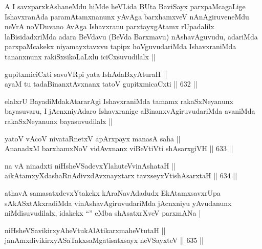 \begin{artha}
A I savxparxkAshaneMdu hiMde heVLida BUta BaviSayx parxpaMcagaLige
IshavxranAda paramAtamxnanunx yAvAga barxhamxveV nAnAgiruveneMdu neVrA
noVDuvano AvAga Ishavxranu parxtayxgAtamx rUpadalilx laBisidadxriMda
adara BeVdavu (BeVda Barxmavu) nAshavAguvudu, adariMda parxpaMcakekx
niyamayxtavxvu tapipx hoVguvudariMda IshavxraniMda tananxnunx
rakiSxsikoLaLxlu iciCxsuvudilalx ||
\end{artha}


\begin{shl}
gupitxmiciCxti savoVR\s pi yata IshAdaBxyAturaH || \\
ayaM tu tadaBinanxtAvxnanx tatoV gupitxmicaCxti ||  632 ||  
\end{shl}

\begin{artha}
elalxrU BayadiMdakAtararAgi IshavxraniMda tamamx rakaSxNeyanunx
bayasuvaru, I jAcnxniyAdaro Ishavxranige aBinanxvAgiruvudariMda
avaniMda rakaSxNeyanunx bayasuvudilalx ||
\end{artha}


\begin{shl}
yatoV vAcoV nivataRnetxV apArxpayx manasA saha || \\
AnanadxM barxhamxNoV vidAvxnanx viBeVtiVti shAsarxgiVH ||  633 ||  
\end{shl}


\begin{shl}
na vA ninadxti niHsheVSadevxYlahuteVvinAshataH || \\
aikAtamxyXdashaRnAdivxdAvxnayxtarx tavxseyxVtishAsarxtaH ||  634 ||  
\end{shl}

\begin{artha}
athavA samasatxdevxYtakekx kAraNavAdadudx EkAtamxsavxrUpa
sAkASxtAkxradiMda vinAshavAgiruvudariMda jAcnxniyu yAvudanunx
niMdisuvudilalx, idakekx ``\stext'' eMba shAsatxrXveV parxmANa |
\end{artha}


\begin{shl}
niHsheVSavikirxyAheVtukAlAtikarxmaheVtutaH || \\
janAmxdivikirxyASaTakxsaMgatisatxsayx neVSayxteV ||  635 || 
\end{shl}

